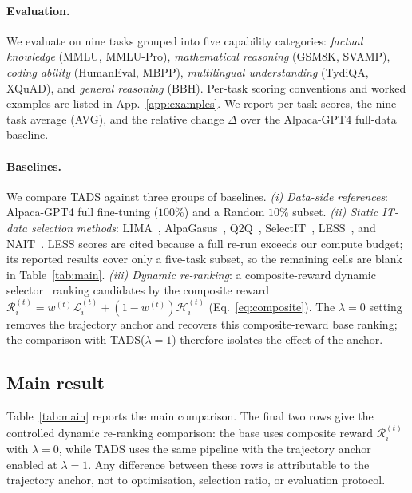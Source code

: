 \paragraph{Evaluation.}
We evaluate on nine tasks grouped into five capability categories:
\emph{factual knowledge} (MMLU, MMLU-Pro), \emph{mathematical
reasoning} (GSM8K, SVAMP), \emph{coding ability} (HumanEval, MBPP),
\emph{multilingual understanding} (TydiQA, XQuAD), and
\emph{general reasoning} (BBH). Per-task scoring conventions and
worked examples are listed in App.~\ref{app:examples}. We report
per-task scores, the nine-task average (AVG), and the relative
change $\Delta$ over the Alpaca-GPT4 full-data baseline.

\paragraph{Baselines.}
We compare \textsc{TADS} against three groups of baselines.
\emph{(i) Data-side references}: Alpaca-GPT4 full fine-tuning
($100\%$) and a Random $10\%$ subset. \emph{(ii) Static IT-data
selection methods}: LIMA~\cite{zhou2023lima},
AlpaGasus~\cite{alpagasus}, Q2Q~\cite{q2q},
SelectIT~\cite{selectit}, LESS~\cite{less}, and
NAIT~\cite{nait2026}. LESS scores are cited because a full re-run
exceeds our compute budget; its reported results cover only a
five-task subset, so the remaining cells are blank in
Table~\ref{tab:main}. \emph{(iii) Dynamic re-ranking}: a
composite-reward dynamic selector~\cite{kung2023activeit,
sun2025dots} ranking candidates by the composite reward
$\mathcal{R}_i^{(t)} = w^{(t)}\mathcal{L}_i^{(t)} +
(1-w^{(t)})\mathcal{H}_i^{(t)}$ (Eq.~\ref{eq:composite}). The
$\lambda=0$ setting removes the trajectory anchor and recovers
this composite-reward base ranking; the comparison with
\textsc{TADS}($\lambda{=}1$) therefore isolates the effect of the
anchor.

\subsection{Main result}
\label{sec:main}

Table~\ref{tab:main} reports the main comparison. The final two
rows give the controlled dynamic re-ranking comparison: the base
uses composite reward $\mathcal{R}_i^{(t)}$ with
$\lambda=0$, while \textsc{TADS} uses the same pipeline with the
trajectory anchor enabled at $\lambda=1$. Any difference between
these rows is attributable to the trajectory anchor, not to
optimisation, selection ratio, or evaluation protocol.

